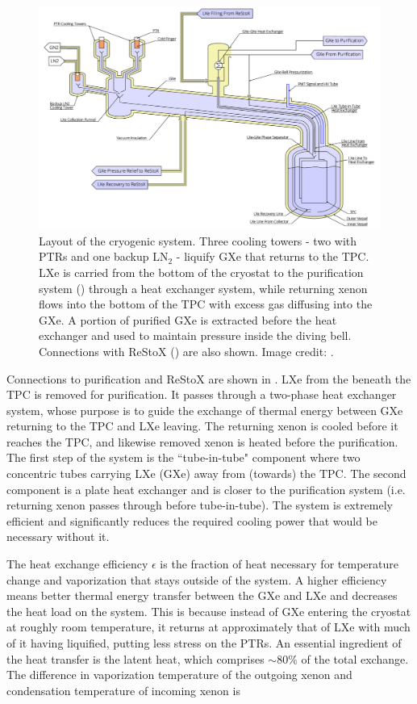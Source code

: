 \begin{figure}
\centering
\includegraphics[width=\textwidth]{CryostatSchematic}
\caption{Layout of the cryogenic system.  Three cooling towers - two with PTRs and one backup $\mathrm{LN_2}$ - liquify GXe that returns
to the TPC.  LXe is carried from the bottom of the cryostat to the purification system () through a heat
exchanger system, while
returning xenon flows into the bottom of the TPC with excess gas diffusing into the GXe.  A portion of purified GXe is extracted
before the heat exchanger and used to maintain pressure inside the diving bell.  Connections with ReStoX ()
are also shown.  Image credit: .}
\label{fig:xenon1t_cryogenics_schematic}
\end{figure}

Connections to purification and ReStoX are shown in .  LXe from the beneath the TPC is removed
for purification.  It passes
through a two-phase heat exchanger system, whose purpose is to guide the exchange of thermal energy between GXe returning to the TPC
and LXe leaving.  The returning xenon is cooled before it reaches the TPC, and likewise removed xenon is heated before
the purification.  The first step of the system is the ``tube-in-tube" component where two concentric tubes carrying LXe (GXe) away from
(towards)
the TPC.  The second component is a plate heat exchanger and is closer to the purification system (i.e. returning xenon passes through
before tube-in-tube).  The system is extremely efficient and significantly reduces the required cooling power that would be necessary
without it.

The heat exchange
efficiency $\epsilon$ is the fraction of heat necessary for temperature change and vaporization that stays outside of the system.  A
higher
efficiency means better thermal energy transfer between the GXe and LXe and decreases the heat load on the system.  This is
because instead of GXe entering the cryostat at roughly
room temperature, it returns at approximately that of LXe with much of it having liquified, putting less stress on the
PTRs.  An essential ingredient of the heat transfer is the latent heat, which comprises ${\sim} 80\%$ of the total exchange.  The
difference in vaporization temperature of the outgoing xenon and condensation temperature of incoming xenon is

